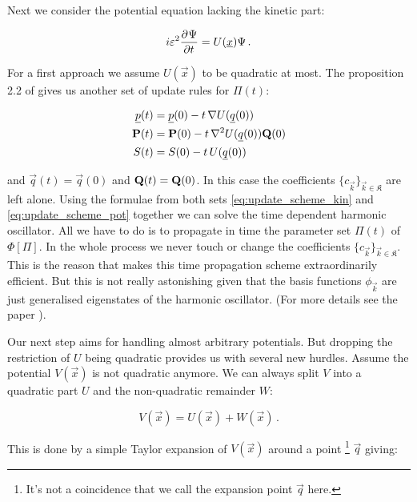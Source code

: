 Next we consider the potential equation lacking the kinetic part:

\begin{equation*}
  i \varepsilon^2  \frac{\partial^{}\Psi}{\partial t^{}} = U(\underline{x}) \Psi \,.
\end{equation*}

For a first approach we assume $U(\vec{x})$ to be quadratic at most. The
proposition 2.2 of \cite{FGL_semiclassical_dynamics} gives us another set of update rules
for $\Pi(t)$:

\begin{equation} \label{eq:update_scheme_pot}
\begin{split}
  \underline{p}(t) & = \underline{p}(0) - t \, \nabla U(\underline{q}(0)) \\
  \mathbf{P}(t) & = \mathbf{P}(0) - t \, \nabla^2 U(\underline{q}(0)) \mathbf{Q}(0) \\
  S(t) & = S(0) - t \, U(\underline{q}(0))
\end{split}
\end{equation}

and $\vec{q}(t) = \vec{q}(0)$ and $\mathbf{Q}(t) = \mathbf{Q}(0)$. In this case the
coefficients $\{c_{\vec{k}}\}_{\vec{k} \in \mathfrak{K}}$ are left alone. Using
the formulae from both sets \eqref{eq:update_scheme_kin} and \eqref{eq:update_scheme_pot}
together we can solve the time dependent harmonic oscillator. All we have to do is to
propagate in time the parameter set $\Pi(t)$ of $\Phi[\Pi]$. In the whole
process we never touch or change the coefficients $\{c_{\vec{k}}\}_{\vec{k} \in \mathfrak{K}}$.
This is the reason that makes this time propagation scheme extraordinarily
efficient. But this is not really astonishing given that the basis functions
$\phi_{\vec{k}}$ are just generalised eigenstates of the harmonic oscillator.
(For more details see the paper \cite{H_ladder_operators}).

Our next step aims for handling almost arbitrary potentials. But dropping the
restriction of $U$ being quadratic provides us with several new hurdles.
Assume the potential $V(\vec{x})$ is not quadratic anymore. We can always split
$V$ into a quadratic part $U$ and the non-quadratic remainder $W$:

\begin{equation*}
  V(\vec{x}) = U(\vec{x}) + W(\vec{x}) \,.
\end{equation*}

This is done by a simple Taylor expansion of $V(\vec{x})$ around a point
\footnote{It's not a coincidence that we call the expansion point $\vec{q}$ here.}
$\vec{q}$ giving:

